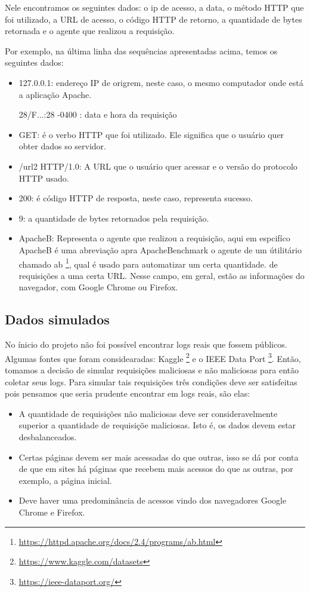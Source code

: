 Nele encontramos os seguintes dados: o ip de acesso, a data, o método HTTP que foi utilizado, 
a URL de acesso, o código HTTP de retorno, a quantidade de bytes retornada e o agente que realizou a requisição.

Por exemplo, na última linha das sequências apresentadas acima, temos os seguintes dados:

\begin{itemize}
    \item 127.0.0.1: endereço IP de origrem, neste caso, o mesmo computador onde está a aplicação Apache.
    \item [28/F...:28 -0400]: data e hora da requisição
    \item GET: é o verbo HTTP que foi utilizado. Ele significa que o usuário quer obter dados so servidor.
    \item /url2 HTTP/1.0: A URL que o usuário quer acessar e o versão do protocolo HTTP usado.
    \item 200: é código HTTP de resposta, neste caso, representa sucesso.
    \item 9: a quantidade de bytes retornados pela requisição. 
    \item ApacheB: Representa o agente que realizou a requisição, aqui em espcifíco ApacheB é uma
    abreviação apra ApacheBenchmark o agente de um útilitário chamado ab \footnote{\url{https://httpd.apache.org/docs/2.4/programs/ab.html}}, 
    qual é usado para automatizar um certa quantidade. de requisições a uma certa URL.
    Nesse campo, em geral, estão as informações do navegador, com Google Chrome ou Firefox.
\end{itemize}


\subsection{Dados simulados}

No ínicio do projeto não foi possível encontrar logs reais que fossem públicos. Algumas fontes
que foram considearadas: Kaggle \footnote{\url{https://www.kaggle.com/datasets}} e o IEEE Data Port 
\footnote{\url{https://ieee-dataport.org/}}. Então, tomamos a decisão de simular requisições maliciosas 
e não maliciosas para então coletar seus logs. Para simular tais requisições três condições deve 
ser satisfeitas pois pensamos que seria prudente encontrar em logs reais, são elas:

\begin{itemize}
    \item A quantidade de requisições não maliciosas deve ser consideravelmente
    superior a quantidade de requisiçõe maliciosas. Isto é, os dados devem estar desbalanceados.
    \item Certas páginas devem ser mais acessadas do que outras, isso se dá por conta 
    de que em sites há páginas que recebem mais acessos do que as outras, por exemplo, a página inicial.
    \item Deve haver uma predominância de acessos vindo dos navegadores Google Chrome e Firefox.
\end{itemize}

